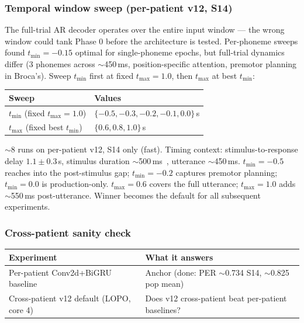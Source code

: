 \documentclass[11pt,letterpaper]{article}
\begin{document}
\subsubsection{Temporal window sweep (per-patient v12, S14)}

The full-trial AR decoder operates over the entire input window --- the wrong window could tank Phase 0 before the architecture is tested. Per-phoneme sweeps found $t_{\min}{=}{-}0.15$ optimal for single-phoneme epochs, but full-trial dynamics differ (3 phonemes across ${\sim}$450\,ms, position-specific attention, premotor planning in Broca's). Sweep $t_{\min}$ first at fixed $t_{\max}{=}1.0$, then $t_{\max}$ at best $t_{\min}$:

\begin{table}[ht!]\centering\small
\begin{tabular}{@{}lp{7cm}@{}}
\toprule
\textbf{Sweep} & \textbf{Values} \\
\midrule
$t_{\min}$ (fixed $t_{\max}{=}1.0$) & $\{-0.5, -0.3, -0.2, -0.1, 0.0\}$\,s \\
$t_{\max}$ (fixed best $t_{\min}$) & $\{0.6, 0.8, 1.0\}$\,s \\
\bottomrule
\end{tabular}
\end{table}

${\sim}$8 runs on per-patient v12, S14 only (fast). Timing context: stimulus-to-response delay $1.1 \pm 0.3$\,s, stimulus duration ${\sim}$500\,ms~\cite{duraivel2023}, utterance ${\sim}$450\,ms. $t_{\min}{=}{-}0.5$ reaches into the post-stimulus gap; $t_{\min}{=}{-}0.2$ captures premotor planning; $t_{\min}{=}0.0$ is production-only. $t_{\max}{=}0.6$ covers the full utterance; $t_{\max}{=}1.0$ adds ${\sim}$550\,ms post-utterance. Winner becomes the default for all subsequent experiments.

\subsubsection{Cross-patient sanity check}

\begin{table}[ht!]\centering\small
\begin{tabular}{@{}lp{8cm}@{}}
\toprule
\textbf{Experiment} & \textbf{What it answers} \\
\midrule
Per-patient Conv2d+BiGRU baseline & Anchor (done: PER ${\sim}$0.734 S14, ${\sim}$0.825 pop mean) \\
Cross-patient v12 default (LOPO, core 4) & Does v12 cross-patient beat per-patient baselines? \\
\bottomrule
\end{tabular}
\end{table}
\end{document}
